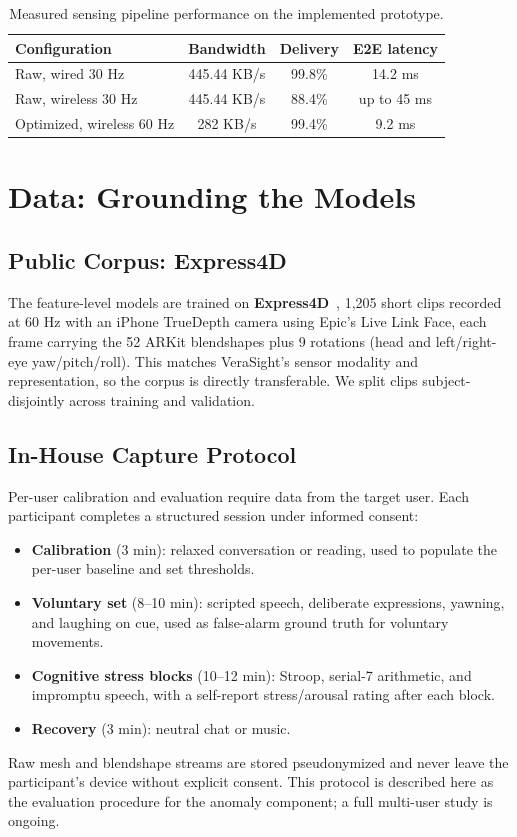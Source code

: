 \documentclass[sigconf]{acmart}
\begin{document}
\begin{table}[h]
\centering
\caption{Measured sensing pipeline performance on the implemented prototype.}
\label{tab:sensing}
\small
\begin{tabular}{lccc}
\toprule
\textbf{Configuration} & \textbf{Bandwidth} & \textbf{Delivery} & \textbf{E2E latency} \\
\midrule
Raw, wired 30 Hz & 445.44 KB/s & 99.8\% & 14.2 ms \\
Raw, wireless 30 Hz & 445.44 KB/s & 88.4\% & up to 45 ms \\
Optimized, wireless 60 Hz & 282 KB/s & 99.4\% & 9.2 ms \\
\bottomrule
\end{tabular}
\end{table}

\section{Data: Grounding the Models}
\label{sec:data}

\subsection{Public Corpus: Express4D}
The feature-level models are trained on \textbf{Express4D}~\cite{aloni2025express4d},
1,205 short clips recorded at 60 Hz with an iPhone TrueDepth camera using Epic's
Live Link Face, each frame carrying the 52 ARKit blendshapes plus 9 rotations
(head and left/right-eye yaw/pitch/roll). This matches VeraSight's sensor
modality and representation, so the corpus is directly transferable. We split
clips subject-disjointly across training and validation.

\subsection{In-House Capture Protocol}
Per-user calibration and evaluation require data from the target user. Each
participant completes a structured session under informed consent:
\begin{itemize}
    \item \textbf{Calibration} (3 min): relaxed conversation or reading, used to
          populate the per-user baseline and set thresholds.
    \item \textbf{Voluntary set} (8--10 min): scripted speech, deliberate
          expressions, yawning, and laughing on cue, used as false-alarm ground
          truth for voluntary movements.
    \item \textbf{Cognitive stress blocks} (10--12 min): Stroop, serial-7
          arithmetic, and impromptu speech, with a self-report stress/arousal
          rating after each block.
    \item \textbf{Recovery} (3 min): neutral chat or music.
\end{itemize}
Raw mesh and blendshape streams are stored pseudonymized and never leave the
participant's device without explicit consent. This protocol is described here
as the evaluation procedure for the anomaly component; a full multi-user study
is ongoing.
\end{document}
